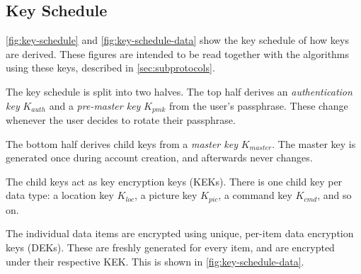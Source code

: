 \documentclass[11pt,a4paper]{article}
\begin{document}
\subsection{Key Schedule}\label{sec:key-schedule}

\autoref{fig:key-schedule} and \autoref{fig:key-schedule-data} show
the key schedule of how keys are derived.
These figures are intended to be read together with the algorithms using these keys,
described in \autoref{sec:subprotocols}.

The key schedule is split into two halves.
The top half derives an \emph{authentication key} $K_{auth}$
and a \emph{pre-master key} $K_{pmk}$ from the user's passphrase.
These change whenever the user decides to rotate their passphrase.

The bottom half derives child keys from a \emph{master key} $K_{master}$.
The master key is generated once during account creation, and afterwards never changes.

The child keys act as key encryption keys (KEKs).
There is one child key per data type: a location key $K_{loc}$, a picture key $K_{pic}$,
a command key $K_{cmd}$, and so on.

The individual data items are encrypted using unique, per-item data encryption keys (DEKs).
These are freshly generated for every item, and are encrypted under their respective KEK.
This is shown in \autoref{fig:key-schedule-data}.
\end{document}
